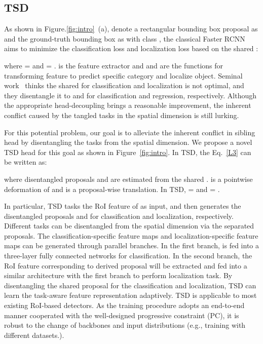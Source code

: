 \documentclass[10pt,twocolumn,letterpaper]{article}
\def \algname{TSD}
\def \loss{PC}
\begin{document}
\subsection{\algname}
As shown in Figure.\ref{fig:intro}~(a),
denote a rectangular bounding box proposal as  and the ground-truth bounding box as  with class ,
the classical Faster RCNN~\cite{ren2015faster} aims to minimize the classification loss and localization loss based on the shared :

where  =  and  = .
 is the feature extractor and  and  are the functions for transforming feature to predict specific category and localize object.
Seminal work~\cite{wu2019rethinking} thinks the shared  for classification and localization is not optimal, and they disentangle it to  and  for classification and regression, respectively. Although the appropriate head-decoupling brings a reasonable improvement, the inherent conflict caused by the tangled tasks in the spatial dimension is still lurking.

For this potential problem, our goal is to alleviate the inherent conflict in sibling head by disentangling the tasks from the spatial dimension. 
We propose a novel \algname{} head for this goal as shown in Figure~\ref{fig:intro}. 
In \algname{}, the Eq.~\ref{L3} can be written as:

where disentangled proposals  and  are estimated from the shared .
 is a pointwise deformation of  and  is a proposal-wise translation.
In \algname{},  =  and  = .

In particular, \algname{} tasks the RoI feature of  as input, and then generates the
disentangled proposals  and  for classification and localization, respectively.
Different tasks can be disentangled from the spatial dimension via the separated proposals.
The classification-specific feature maps  and localization-specific feature maps  can be generated through parallel branches. 
In the first branch,  is fed into a three-layer fully connected networks for classification.
In the second branch, the RoI feature  corresponding to derived proposal  will be extracted and fed into a similar architecture with the first branch to perform localization task. By disentangling the shared proposal for the classification and localization, \algname{} can learn the task-aware feature representation adaptively. 
\algname{} is applicable to most existing RoI-based detectors.
As the training procedure adopts an end-to-end manner cooperated with the well-designed progressive constraint (\loss{}), it is robust to the change of backbones and input distributions (e.g., training with different datasets.).
\end{document}
